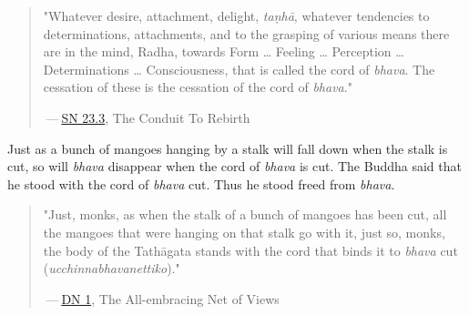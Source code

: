 \begin{quote}
"Whatever desire, attachment, delight, \emph{taṇhā}, whatever tendencies to determinations, attachments, and to the grasping of various means there are in the mind, Radha, towards Form \ldots{} Feeling \ldots{} Perception \ldots{} Determinations \ldots{} Consciousness, that is called the cord of \emph{bhava}. The cessation of these is the cessation of the cord of \emph{bhava}."

 --- \href{https://suttacentral.net/sn23.3/en/sujato}{SN 23.3}, The Conduit To Rebirth
\end{quote}

Just as a bunch of mangoes hanging by a stalk will fall down when the stalk is cut, so will \emph{bhava} disappear when the cord of \emph{bhava} is cut. The Buddha said that he stood with the cord of \emph{bhava} cut. Thus he stood freed from \emph{bhava}.

\begin{quote}
"Just, monks, as when the stalk of a bunch of mangoes has been cut, all the mangoes that were hanging on that stalk go with it, just so, monks, the body of the Tathāgata stands with the cord that binds it to \emph{bhava} cut (\emph{ucchinnabhavanettiko})."

 --- \href{https://suttacentral.net/dn1/en/bodhi}{DN 1}, The All-embracing Net of Views
\end{quote}

